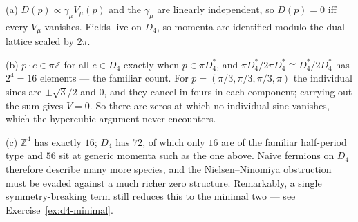 {(a) $D(p)\propto\gamma_\mu V_\mu(p)$ and the $\gamma_\mu$ are linearly
independent, so $D(p)=0$ iff every $V_\mu$ vanishes. Fields live on $D_4$, so
momenta are identified modulo the dual lattice scaled by $2\pi$.

(b) $p\cdot e\in\pi\mathbb{Z}$ for all $e\in D_4$ exactly when $p\in\pi D_4^{*}$,
and $\pi D_4^{*}/2\pi D_4^{*}\cong D_4^{*}/2D_4^{*}$ has $2^4=16$ elements ---
the familiar count. For $p=(\pi/3,\pi/3,\pi/3,\pi)$ the individual sines are
$\pm\sqrt3/2$ and $0$, and they cancel in fours in each component; carrying out
the sum gives $V=0$. So there are zeros at which no individual sine vanishes,
which the hypercubic argument never encounters.

(c) $\mathbb{Z}^4$ has exactly $16$; $D_4$ has $72$, of which only $16$ are of
the familiar half-period type and $56$ sit at generic momenta such as the one
above. Naive fermions on $D_4$ therefore describe many more species, and the
Nielsen--Ninomiya obstruction must be evaded against a much richer zero
structure. Remarkably, a single symmetry-breaking term still reduces this to the
minimal two --- see Exercise~\ref{ex:d4-minimal}.}

